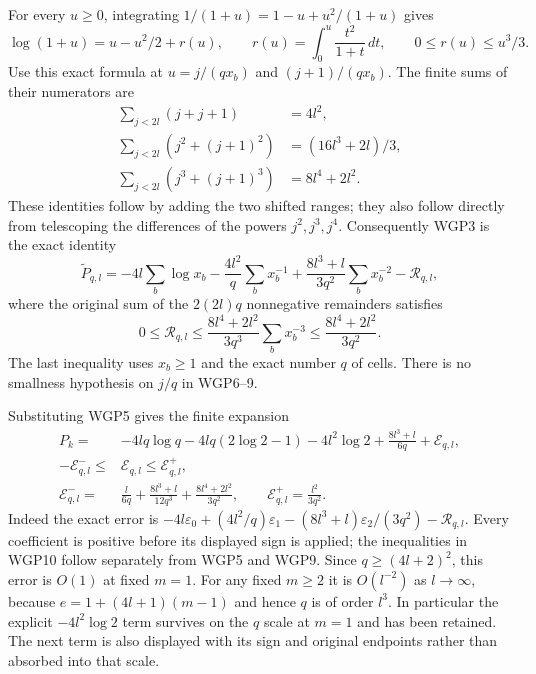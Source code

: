 \documentclass[11pt,a4paper]{article}
\begin{document}
For every $u\ge0$, integrating
$1/(1+u)=1-u+u^2/(1+u)$ gives
\[
 \log(1+u)=u-u^2/2+r(u),\qquad
 r(u)=\int_0^u\frac{t^2}{1+t}\,dt,\qquad 0\le r(u)\le u^3/3.
 \tag{WGP6}
\]
Use this exact formula at $u=j/(qx_b)$ and $(j+1)/(qx_b)$.
The finite sums of their numerators are
\[
 \begin{aligned}
 \sum_{j<2l}(j+j+1)&=4l^2,\\
 \sum_{j<2l}(j^2+(j+1)^2)&=(16l^3+2l)/3,\\
 \sum_{j<2l}(j^3+(j+1)^3)&=8l^4+2l^2.
 \end{aligned}\tag{WGP7}
\]
These identities follow by adding the two shifted ranges; they also follow
directly from telescoping the differences of the powers $j^2,j^3,j^4$.
Consequently WGP3 is the exact identity
\[
 \widetilde P_{q,l}
 =-4l\sum_b\log x_b-\frac{4l^2}{q}\sum_bx_b^{-1}
   +\frac{8l^3+l}{3q^2}\sum_bx_b^{-2}-\mathcal R_{q,l},
 \tag{WGP8}
\]
where the original sum of the $2(2l)q$ nonnegative remainders satisfies
\[
 0\le\mathcal R_{q,l}
 \le\frac{8l^4+2l^2}{3q^3}\sum_bx_b^{-3}
 \le\frac{8l^4+2l^2}{3q^2}.
 \tag{WGP9}
\]
The last inequality uses $x_b\ge1$ and the exact number $q$ of cells.
There is no smallness hypothesis on $j/q$ in WGP6--9.

Substituting WGP5 gives the finite expansion
\[
 \boxed{\begin{aligned}
 P_k={}&-4lq\log q-4lq(2\log2-1)-4l^2\log2
             +\frac{8l^3+l}{6q}+\mathcal E_{q,l},\\
 -\mathcal E^-_{q,l}\le{}&\mathcal E_{q,l}\le\mathcal E^+_{q,l},\\
 \mathcal E^-_{q,l}={}&\frac{l}{6q}
       +\frac{8l^3+l}{12q^3}
       +\frac{8l^4+2l^2}{3q^2},\qquad
 \mathcal E^+_{q,l}=\frac{l^2}{3q^2}.
 \end{aligned}}\tag{WGP10}
\]
Indeed the exact error is
$-4l\varepsilon_0+(4l^2/q)\varepsilon_1
 -(8l^3+l)\varepsilon_2/(3q^2)-\mathcal R_{q,l}$.
Every coefficient is positive before its displayed sign is applied;
the inequalities in WGP10 follow separately from WGP5 and WGP9.
Since $q\ge(4l+2)^2$, this error is $O(1)$ at fixed $m=1$.
For any fixed $m\ge2$ it is $O(l^{-2})$ as $l\to\infty$, because
$e=1+(4l+1)(m-1)$ and hence $q$ is of order $l^3$.
In particular the explicit $-4l^2\log2$ term survives on the $q$ scale
at $m=1$ and has been retained. The next term is also displayed with
its sign and original endpoints rather than absorbed into that scale.
\end{document}
